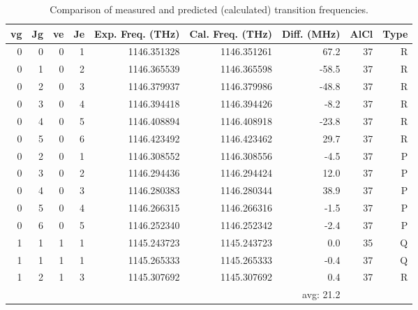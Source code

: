\begin{table}
\begin{tabu}{rrrrrrrrr}
\toprule
vg & Jg & ve & Je & Exp. Freq. (THz) & Cal. Freq. (THz) & Diff. (MHz) & AlCl & Type\\ \midrule 
\rowfont{\color{red}}0 & 0 & 0 & 1 & 1146.351328 & 1146.351261 & 67.2 & 37 & R\\
\rowfont{\color{red}}0 & 1 & 0 & 2 & 1146.365539 & 1146.365598 & -58.5 & 37 & R\\
\rowfont{\color{red}}0 & 2 & 0 & 3 & 1146.379937 & 1146.379986 & -48.8 & 37 & R\\
\rowfont{\color{red}}0 & 3 & 0 & 4 & 1146.394418 & 1146.394426 & -8.2 & 37 & R\\
\rowfont{\color{red}}0 & 4 & 0 & 5 & 1146.408894 & 1146.408918 & -23.8 & 37 & R\\
\rowfont{\color{red}}0 & 5 & 0 & 6 & 1146.423492 & 1146.423462 & 29.7 & 37 & R\\
\rowfont{\color{blue}}0 & 2 & 0 & 1 & 1146.308552 & 1146.308556 & -4.5 & 37 & P\\
\rowfont{\color{blue}}0 & 3 & 0 & 2 & 1146.294436 & 1146.294424 & 12.0 & 37 & P\\
\rowfont{\color{blue}}0 & 4 & 0 & 3 & 1146.280383 & 1146.280344 & 38.9 & 37 & P\\
\rowfont{\color{blue}}0 & 5 & 0 & 4 & 1146.266315 & 1146.266316 & -1.5 & 37 & P\\
\rowfont{\color{blue}}0 & 6 & 0 & 5 & 1146.252340 & 1146.252342 & -2.4 & 37 & P\\
1 & 1 & 1 & 1 & 1145.243723 & 1145.243723 & 0.0 & 35 & Q\\
1 & 1 & 1 & 1 & 1145.265333 & 1145.265333 & -0.4 & 37 & Q\\
\rowfont{\color{red}}1 & 2 & 1 & 3 & 1145.307692 & 1145.307692 & 0.4 & 37 & R\\
\midrule
 &  &  &  &  &  &  avg: 21.2\\
\bottomrule
\end{tabu}\caption{Comparison of measured and predicted (calculated) transition frequencies.}\end{table}
